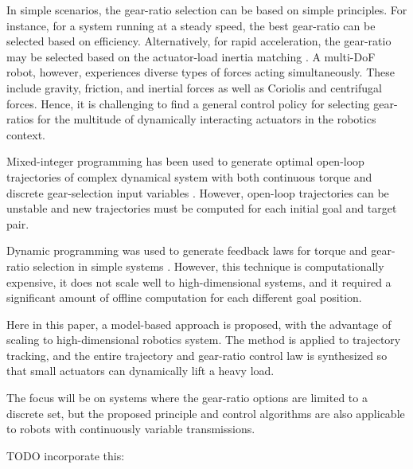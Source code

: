 In simple scenarios, the gear-ratio selection can be based on simple principles. For instance, for a system running at a steady speed, the best gear-ratio can be selected based on efficiency. Alternatively, for rapid acceleration, the gear-ratio may be selected based on the actuator-load inertia matching \cite{giberti_effects_2010} \cite{chen_generalized_1991}. A multi-DoF robot, however, experiences diverse types of forces acting simultaneously. These include gravity, friction, and inertial forces as well as Coriolis and centrifugal forces. Hence, it is challenging to find a general control policy for selecting gear-ratios for the multitude of dynamically interacting actuators in the robotics context. 

Mixed-integer programming has been used to generate optimal open-loop trajectories of complex dynamical system with both continuous torque and discrete gear-selection input variables \cite{gerdts_solving_2005}. However, open-loop trajectories can be unstable and new trajectories must be computed for each initial goal and target pair. 


Dynamic programming was used to generate feedback laws for torque and gear-ratio selection in simple systems \cite{girard_practical_2016}. However, this technique is computationally expensive, it does not scale well to high-dimensional systems, and it required a significant amount of offline computation for each different goal position. 


Here in this paper, a model-based approach is proposed, with the advantage of scaling to high-dimensional robotics system. The method is applied to trajectory tracking, and the entire trajectory and gear-ratio control law is synthesized so that small actuators can dynamically lift a heavy load. 

The focus will be on systems where the gear-ratio options are limited to a discrete set, but the proposed principle and control algorithms are also applicable to robots with continuously variable transmissions.

TODO incorporate this:


